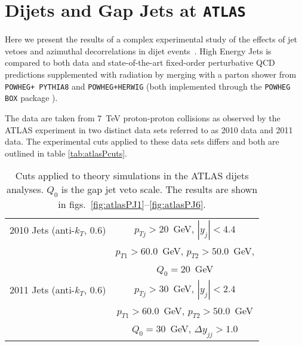 
\chapter{Dijets and Gap Jets at \texttt{ATLAS}}
\label{chap:ATLAS}

	Here we present the results of a complex experimental study of the effects of jet vetoes and
	azimuthal decorrelations in dijet events~\cite{Aad:2014pua}.  High Energy Jets is compared
	to both data and state-of-the-art fixed-order perturbative QCD predictions supplemented with
	radiation by merging with a parton shower from \texttt{POWHEG+
	PYTHIA8} and \texttt{POWHEG+HERWIG} (both implemented through the \texttt{POWHEG BOX} package
	\cite{1126-6708-2004-11-040}).

	The data are taken from 7~TeV proton-proton collisions as observed by the ATLAS
	experiment in two distinct data sets referred to as 2010 data and 2011 data.  The
	experimental cuts applied to these data sets differs and both are outlined in table
	\eqref{tab:atlasPcuts}.

	\begin{table}[bth]
	  \centering
	  \begin{tabular}{|l|c|}
	    \hline
	    2010 Jets (anti-$k_T$, 0.6) & $p_{Tj}>20$~GeV, \; $|y_j|<4.4$ \\
	    & $p_{T1}> 60.0$~GeV, \; $p_{T2}> 50.0$~GeV, \; \\
	    & $Q_0=20$~GeV \\
	    \hline
	    2011 Jets (anti-$k_T$, 0.6) & $p_{Tj}>30$~GeV, \; $|y_j|<2.4$ \\
	    & $p_{T1}> 60.0$~GeV, \; $p_{T2}> 50.0$~GeV \\
	    & \; $Q_0=30$~GeV, \; $\Delta y_{jj}>1.0$\\
	\hline
	  \end{tabular}
	  \caption{Cuts applied to theory simulations in the ATLAS dijets analyses.
	  $Q_0$ is the gap jet veto scale. The results are shown in
	  figs.~\eqref{fig:atlasPJ1}--\eqref{fig:atlasPJ6}.}
	  \label{tab:atlasPcuts}
	\end{table}

